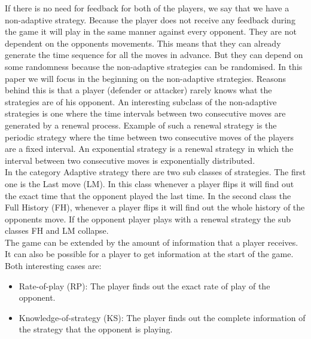 \documentclass[journal,a4paper]{IEEEtran}
\begin{document}
If there is no need for feedback for both of the players, we say that we have a non-adaptive strategy. Because the player does not receive any feedback during the game it will play in the same manner against every opponent. They are not dependent on the opponents movements. This means that they can already generate the time sequence for all the moves in advance.  But they can depend on some randomness because the non-adaptive strategies can be randomised. 
In this paper we will focus in the beginning on the non-adaptive strategies. Reasons behind this is that a player (defender or attacker) rarely knows what the strategies are of his opponent. An interesting subclass of the non-adaptive strategies is one where the time intervals between two consecutive moves are generated by a renewal process. Example of such a renewal strategy is the periodic strategy where the time between two consecutive moves of the players are a fixed interval. An exponential strategy is a renewal strategy in which the interval between two consecutive moves is exponentially distributed.  \\


In the category Adaptive strategy there are two sub classes of strategies. The first one is the Last move (LM). In this class whenever a player flips it will find out the exact time that the opponent played the last time. In the second class the Full History (FH), whenever a player flips it will find out the whole history of the opponents move. If the opponent player plays with a renewal strategy the sub classes FH and LM collapse. \\


 
The game can be extended by the amount of information that a player receives. It can also be possible for a player to get information at the start of the game. Both interesting cases are:
\begin{itemize}
\item Rate-of-play (RP): The player finds out the exact rate of play of the opponent.
\item Knowledge-of-strategy (KS): The player finds out the complete information of the strategy that the opponent is playing.
\end{itemize}




 
\end{document}
